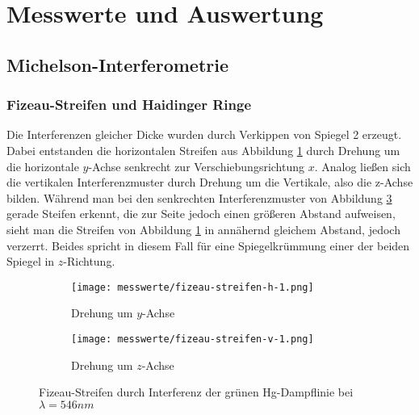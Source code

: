 \section{Messwerte und Auswertung} %
\label{sec:messwerte_und_auswertung}

	\subsection{Michelson-Interferometrie} %
	\label{sub:michelson_interferometrie}
	
		\subsubsection{Fizeau-Streifen und Haidinger Ringe} %
		\label{ssub:fizeau_streifen}

			Die Interferenzen gleicher Dicke wurden durch Verkippen von Spiegel 2 erzeugt.
			Dabei entstanden die horizontalen Streifen aus Abbildung \ref{fig:fizeau-h-1} durch Drehung um die horizontale $y$-Achse senkrecht zur Verschiebungsrichtung $x$.
			Analog ließen sich die vertikalen Interferenzmuster durch Drehung um die Vertikale, also die z-Achse bilden.
			Während man bei den senkrechten Interferenzmuster von Abbildung \ref{fig:fizeau-v} gerade Steifen erkennt, die zur Seite jedoch einen größeren Abstand aufweisen, sieht man die Streifen von Abbildung \ref{fig:fizeau-h-1} in annähernd gleichem Abstand, jedoch verzerrt.
			Beides spricht in diesem Fall für eine Spiegelkrümmung einer der beiden Spiegel in $z$-Richtung.
		
			\begin{figure}[htb]
				\begin{subfigure}[b]{.45\textwidth}
					\centering
					\texttt{[image: messwerte/fizeau-streifen-h-1.png]}
					\caption{Drehung um $y$-Achse}
					\label{fig:fizeau-h-1}
				\end{subfigure}
				\begin{subfigure}[b]{.55\textwidth}
					\centering
					\texttt{[image: messwerte/fizeau-streifen-v-1.png]}
					\caption{Drehung um $z$-Achse}
					\label{fig:fizeau-v}
				\end{subfigure}
				\caption{Fizeau-Streifen durch Interferenz der grünen Hg-Dampflinie bei $\lambda = 546 \unit{nm}$}
			\end{figure}


